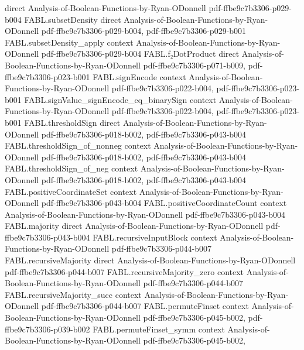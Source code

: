 \begin{theorem}
  {direct}
  {Analysis-of-Boolean-Functions-by-Ryan-ODonnell}
  {pdf-ffbe9c7b3306-p029-b004}
\proofstep
  {FABL.subsetDensity}
  {direct}
  {Analysis-of-Boolean-Functions-by-Ryan-ODonnell}
  {pdf-ffbe9c7b3306-p029-b004,
    pdf-ffbe9c7b3306-p029-b001}
\proofstep
  {FABL.subsetDensity_apply}
  {context}
  {Analysis-of-Boolean-Functions-by-Ryan-ODonnell}
  {pdf-ffbe9c7b3306-p029-b004}
\proofstep
  {FABL.f₂DotProduct}
  {direct}
  {Analysis-of-Boolean-Functions-by-Ryan-ODonnell}
  {pdf-ffbe9c7b3306-p071-b009,
    pdf-ffbe9c7b3306-p023-b001}
\proofstep
  {FABL.signEncode}
  {context}
  {Analysis-of-Boolean-Functions-by-Ryan-ODonnell}
  {pdf-ffbe9c7b3306-p022-b004,
    pdf-ffbe9c7b3306-p023-b001}
\proofstep
  {FABL.signValue_signEncode_eq_binarySign}
  {context}
  {Analysis-of-Boolean-Functions-by-Ryan-ODonnell}
  {pdf-ffbe9c7b3306-p022-b004,
    pdf-ffbe9c7b3306-p023-b001}
\proofstep
  {FABL.thresholdSign}
  {direct}
  {Analysis-of-Boolean-Functions-by-Ryan-ODonnell}
  {pdf-ffbe9c7b3306-p018-b002,
    pdf-ffbe9c7b3306-p043-b004}
\proofstep
  {FABL.thresholdSign_of_nonneg}
  {context}
  {Analysis-of-Boolean-Functions-by-Ryan-ODonnell}
  {pdf-ffbe9c7b3306-p018-b002,
    pdf-ffbe9c7b3306-p043-b004}
\proofstep
  {FABL.thresholdSign_of_neg}
  {context}
  {Analysis-of-Boolean-Functions-by-Ryan-ODonnell}
  {pdf-ffbe9c7b3306-p018-b002,
    pdf-ffbe9c7b3306-p043-b004}
\proofstep
  {FABL.positiveCoordinateSet}
  {context}
  {Analysis-of-Boolean-Functions-by-Ryan-ODonnell}
  {pdf-ffbe9c7b3306-p043-b004}
\proofstep
  {FABL.positiveCoordinateCount}
  {context}
  {Analysis-of-Boolean-Functions-by-Ryan-ODonnell}
  {pdf-ffbe9c7b3306-p043-b004}
\proofstep
  {FABL.majority}
  {direct}
  {Analysis-of-Boolean-Functions-by-Ryan-ODonnell}
  {pdf-ffbe9c7b3306-p043-b004}
\proofstep
  {FABL.recursiveInputBlock}
  {context}
  {Analysis-of-Boolean-Functions-by-Ryan-ODonnell}
  {pdf-ffbe9c7b3306-p044-b007}
\proofstep
  {FABL.recursiveMajority}
  {direct}
  {Analysis-of-Boolean-Functions-by-Ryan-ODonnell}
  {pdf-ffbe9c7b3306-p044-b007}
\proofstep
  {FABL.recursiveMajority_zero}
  {context}
  {Analysis-of-Boolean-Functions-by-Ryan-ODonnell}
  {pdf-ffbe9c7b3306-p044-b007}
\proofstep
  {FABL.recursiveMajority_succ}
  {context}
  {Analysis-of-Boolean-Functions-by-Ryan-ODonnell}
  {pdf-ffbe9c7b3306-p044-b007}
\proofstep
  {FABL.permuteFinset}
  {context}
  {Analysis-of-Boolean-Functions-by-Ryan-ODonnell}
  {pdf-ffbe9c7b3306-p045-b002,
    pdf-ffbe9c7b3306-p039-b002}
\proofstep
  {FABL.permuteFinset_symm}
  {context}
  {Analysis-of-Boolean-Functions-by-Ryan-ODonnell}
  {pdf-ffbe9c7b3306-p045-b002,
}
\end{theorem}
